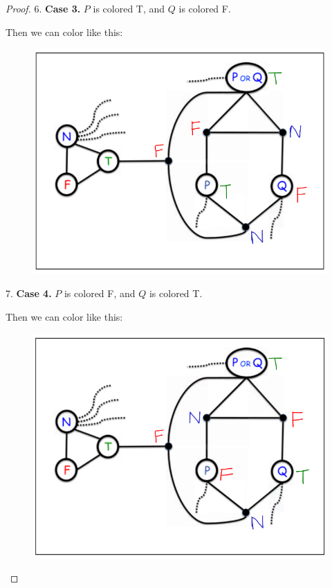 \documentclass[14pt]{extarticle}
\begin{document}
\begin{proof}
6. {\bf Case 3.} $P$ is colored T, and $Q$ is colored F.

Then we can color like this:

\begin{figure}[ht!]
\centering
\includegraphics[scale=0.3]{3-color-3.png}
\end{figure}

7. {\bf Case 4.} $P$ is colored F, and $Q$ is colored T.

Then we can color like this:

\begin{figure}[ht!]
\centering
\includegraphics[scale=0.3]{3-color-4.png}
\end{figure}

\end{proof}
\end{document}
